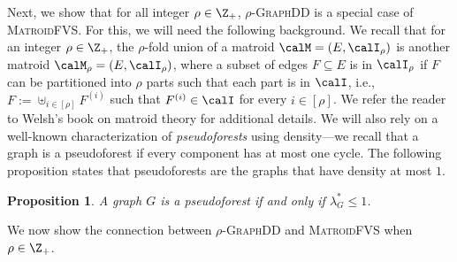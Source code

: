 \documentclass{article}
\newtheorem{proposition}{Proposition}[section]
\newcommand{\mfvs}{\textsc{MatroidFVS}\xspace}
\newcommand{\densitydeletionset}{\textsc{GraphDD}\xspace}
\newcommand{\rhodensitydeletionset}{\ensuremath{\rho\text{-}}\densitydeletionset\xspace}
\begin{document}
Next, we show that for all integer $\rho \in \Z_+$, \rhodensitydeletionset is a special case of \mfvs. For this, we will need the following background. We recall that for an integer $\rho\in\Z_+$, the $\rho$-fold union of a matroid $\calM = (E, \calI_\rho)$ is another matroid $\calM_\rho = (E, \calI_{\rho})$, where a subset of edges $F\subseteq E$ is in $\calI_{\rho}$ if $F$ can be partitioned into $\rho$ parts such that each part is in $\calI$, i.e., $F := \uplus_{i \in [\rho]} F^{(i)}$ such that $F^{(i)} \in \calI$ for every $i\in [\rho]$. We refer the reader to Welsh's book on matroid theory \cite{Welsh-book} for additional details. 
We will also rely on a well-known characterization of \emph{pseudoforests} using density---we recall that a graph is a pseudoforest if every component has at most one cycle. The following proposition states that pseudoforests are the graphs that have density at most $1$.
\begin{proposition}\cite{chandrasekaran2024polyhedralaspectsfeedbackvertex}\label{prop:psuedoforest-characterization}
    A graph $G$ is a pseudoforest if and only if $\lambda^*_G \leq 1$.
\end{proposition}

We now show the connection between \rhodensitydeletionset and \mfvs when $\rho \in \Z_+$.
\end{document}
